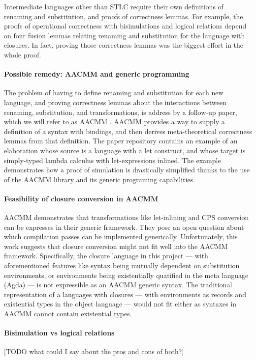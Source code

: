 \documentclass[bsc,frontabs,oneside,singlespacing,parskip,deptreport]{infthesis}
\theoremstyle{definition}
\begin{document}
Intermediate languages other than STLC require their own definitions
of renaming and substitution, and proofs of correctness lemmas. For
example, the proofs of operational correctness with bisimulations and
logical relations depend on four fusion lemmas relating renaming and
substitution for the language with closures. In fact, proving those
correctness lemmas was the biggest effort in the whole proof.

\paragraph{Possible remedy: AACMM and generic programming}
The problem of having to define renaming and substitution for each new
language, and proving correctness lemmas about the interactions
between renaming, substitution, and transformations, is address by a
follow-up paper, which we will refer to as AACMM
\cite{DBLP:journals/pacmpl/AllaisA0MM18}. AACMM provides a way to
supply a definition of a syntax with bindings, and then derives
meta-theoretical correctness lemmas from that definition. The paper
repository contains an example of an elaboration whose source is a
language with a let construct, and whose target is simply-typed lambda
calculus with let-expressions inlined. The example demonstrates how a
proof of simulation is drastically simplified thanks to the use of the
AACMM library and its generic programing capabilities.

\paragraph{Feasibility of closure conversion in AACMM}
AACMM demonstrates that transformations like let-inlining and CPS
conversion can be expresses in their generic framework. They pose an
open question about which compilation passes can be implemented
generically. Unfortunately, this work suggests that closure conversion
might not fit well into the AACMM framework. Specifically, the
closure language in this project --- with aforementioned features like
syntax being mutually dependent on substitution environments, or
environments being existentially quatified in the meta language (Agda)
--- is not expressible as an AACMM generic syntax. The traditional
representation of a languages with closures --- with environments as
records and existential types in the object language --- would not fit
either as syntaxes in AACMM cannot contain existential types.

\paragraph{Bisimulation vs logical relations}
[TODO what could I say about the pros and cons of both?]
\end{document}
